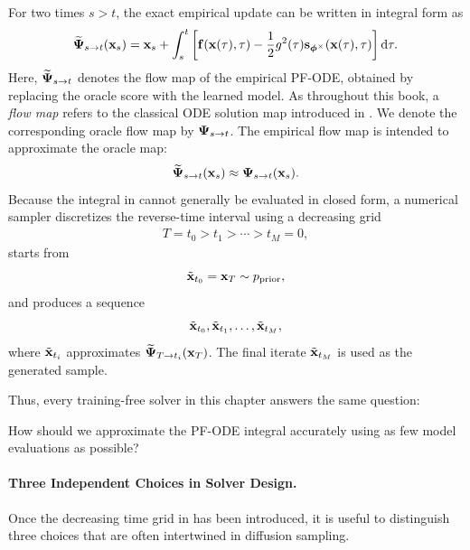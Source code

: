 For two times $s>t$, the exact empirical update can be written in integral
form as
\begin{align}
\label{eq:solution-int-score}
\begin{aligned}
    \widetilde{{\bm{\Psi}}}_{s\to t}({\mathbf{x}}_s)
    =
    {\mathbf{x}}_s
    +
    \int_s^t
    \left[
        {\mathbf{f}}({\mathbf{x}}(\tau),\tau)
        -
        \frac{1}{2}g^2(\tau)
        {\mathbf{s}}_{\bm{\phi}^\times}({\mathbf{x}}(\tau),\tau)
    \right]\mathop{}\!\mathrm{d} \tau .
\end{aligned}
\end{align}
Here, $\widetilde{{\bm{\Psi}}}_{s\to t}$ denotes the flow map of the empirical
PF-ODE, obtained by replacing the oracle score with the learned model.
As throughout this book, a \emph{flow map} refers to the classical ODE
solution map introduced in . We denote the
corresponding oracle flow map by ${\bm{\Psi}}_{s\to t}$. The empirical flow
map is intended to approximate the oracle map:
\[
    \widetilde{{\bm{\Psi}}}_{s\to t}({\mathbf{x}}_s)
    \approx
    {\bm{\Psi}}_{s\to t}({\mathbf{x}}_s).
\]
Because the integral in  cannot generally
be evaluated in closed form, a numerical sampler discretizes the
reverse-time interval using a decreasing grid
\begin{align}
\label{eq:time-step-def}
    T=t_0>t_1>\cdots>t_M=0,
\end{align}
starts from
\[
    \tilde{{\mathbf{x}}}_{t_0}={\mathbf{x}}_T\sim p_{\mathrm{prior}},
\]
and produces a sequence
\[
    \tilde{{\mathbf{x}}}_{t_0},\tilde{{\mathbf{x}}}_{t_1},\ldots,\tilde{{\mathbf{x}}}_{t_M},
\]
where $\tilde{{\mathbf{x}}}_{t_i}$ approximates
$\widetilde{{\bm{\Psi}}}_{T\to t_i}({\mathbf{x}}_T)$. The final iterate
$\tilde{{\mathbf{x}}}_{t_M}$ is used as the generated sample.

Thus, every training-free solver in this chapter answers the same question:
\begin{question}
How should we approximate the PF-ODE integral accurately using as few
model evaluations as possible?
\end{question}

\paragraph{Three Independent Choices in Solver Design.}
Once the decreasing time grid in  has been introduced,
it is useful to distinguish three choices that are often intertwined in
diffusion sampling.

